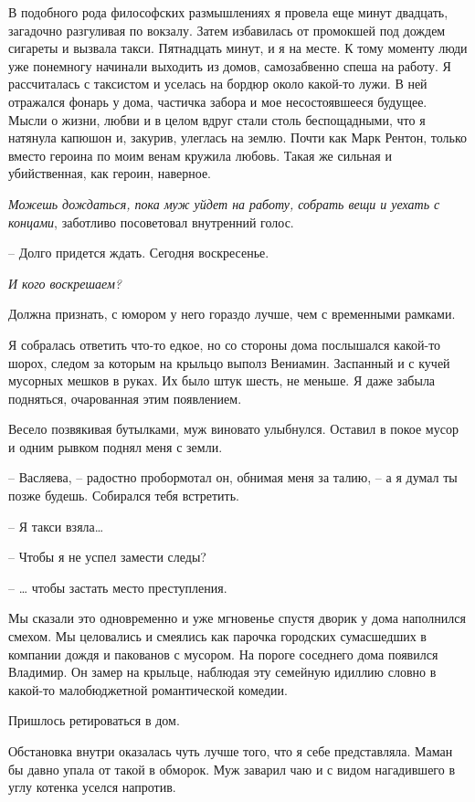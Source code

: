 \documentclass[
]{book}
\begin{document}
В подобного рода философских размышлениях я провела еще минут двадцать, загадочно разгуливая по вокзалу. Затем избавилась от промокшей под дождем сигареты и вызвала такси. Пятнадцать минут, и я на месте. К тому моменту люди уже понемногу начинали выходить из домов, самозабвенно спеша на работу. Я рассчиталась с таксистом и уселась на бордюр около какой-то лужи. В ней отражался фонарь у дома, частичка забора и мое несостоявшееся будущее. Мысли о жизни, любви и в целом вдруг стали столь беспощадными, что я натянула капюшон и, закурив, улеглась на землю. Почти как Марк Рентон, только вместо героина по моим венам кружила любовь. Такая же сильная и убийственная, как героин, наверное.

\emph{Можешь дождаться, пока муж уйдет на работу, собрать вещи и уехать с концами}, заботливо посоветовал внутренний голос.

-- Долго придется ждать. Сегодня воскресенье.

\emph{И кого воскрешаем?}

Должна признать, с юмором у него гораздо лучше, чем с временными рамками.

Я собралась ответить что-то едкое, но со стороны дома послышался какой-то шорох, следом за которым на крыльцо выполз Вениамин. Заспанный и с кучей мусорных мешков в руках. Их было штук шесть, не меньше. Я даже забыла подняться, очарованная этим появлением.

Весело позвякивая бутылками, муж виновато улыбнулся. Оставил в покое мусор и одним рывком поднял меня с земли.

-- Васляева, -- радостно пробормотал он, обнимая меня за талию, -- а я думал ты позже будешь. Собирался тебя встретить.

-- Я такси взяла\ldots{}

-- Чтобы я не успел замести следы?

-- \ldots{} чтобы застать место преступления.

Мы сказали это одновременно и уже мгновенье спустя дворик у дома наполнился смехом. Мы целовались и смеялись как парочка городских сумасшедших в компании дождя и пакованов с мусором. На пороге соседнего дома появился Владимир. Он замер на крыльце, наблюдая эту семейную идиллию словно в какой-то малобюджетной романтической комедии.

Пришлось ретироваться в дом.

Обстановка внутри оказалась чуть лучше того, что я себе представляла. Маман бы давно упала от такой в обморок. Муж заварил чаю и с видом нагадившего в углу котенка уселся напротив.
\end{document}
